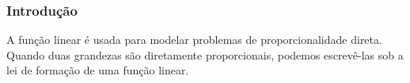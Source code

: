 \subsubsection{Introdução}


A função linear é usada para modelar problemas de
proporcionalidade direta. Quando duas grandezas são
diretamente proporcionais, podemos escrevê-las sob a lei de
formação de uma função linear.